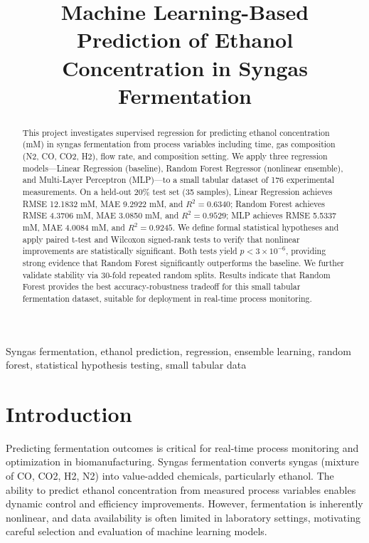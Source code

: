 \documentclass[conference]{IEEEtran}
\title{Machine Learning-Based Prediction of Ethanol Concentration in Syngas Fermentation}
\author{\IEEEauthorblockN{Ying Tan}
\IEEEauthorblockA{CIS 732 / CIS 830, Kansas State University}}
\begin{document}
\maketitle

\begin{abstract}
This project investigates supervised regression for predicting ethanol concentration (mM) in syngas fermentation from process variables including time, gas composition (N2, CO, CO2, H2), flow rate, and composition setting. We apply three regression models—Linear Regression (baseline), Random Forest Regressor (nonlinear ensemble), and Multi-Layer Perceptron (MLP)—to a small tabular dataset of 176 experimental measurements. On a held-out 20\% test set (35 samples), Linear Regression achieves RMSE 12.1832 mM, MAE 9.2922 mM, and $R^2=0.6340$; Random Forest achieves RMSE 4.3706 mM, MAE 3.0850 mM, and $R^2=0.9529$; MLP achieves RMSE 5.5337 mM, MAE 4.0084 mM, and $R^2=0.9245$. We define formal statistical hypotheses and apply paired t-test and Wilcoxon signed-rank tests to verify that nonlinear improvements are statistically significant. Both tests yield $p<3\times10^{-6}$, providing strong evidence that Random Forest significantly outperforms the baseline. We further validate stability via 30-fold repeated random splits. Results indicate that Random Forest provides the best accuracy-robustness tradeoff for this small tabular fermentation dataset, suitable for deployment in real-time process monitoring.
\end{abstract}

\begin{IEEEkeywords}
Syngas fermentation, ethanol prediction, regression, ensemble learning, random forest, statistical hypothesis testing, small tabular data
\end{IEEEkeywords}

\section{Introduction}
Predicting fermentation outcomes is critical for real-time process monitoring and optimization in biomanufacturing. Syngas fermentation converts syngas (mixture of CO, CO2, H2, N2) into value-added chemicals, particularly ethanol. The ability to predict ethanol concentration from measured process variables enables dynamic control and efficiency improvements. However, fermentation is inherently nonlinear, and data availability is often limited in laboratory settings, motivating careful selection and evaluation of machine learning models.
\end{document}

